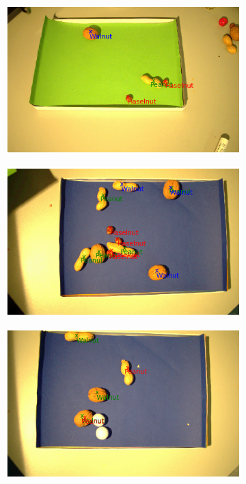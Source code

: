 \documentclass[journal,onecolumn,12pt]{IEEEtran}
\begin{document}
\begin{figure}
	\centering
	\begin{subfigure}[b]{0.4\textwidth}
		\centering
		\includegraphics[width=\textwidth]{images/od/perfect_70.png}
	\end{subfigure}
	\begin{subfigure}[b]{0.4\textwidth}  
		\centering 
		\includegraphics[width=\textwidth]{images/od/CV19_video_337.png}
	\end{subfigure}
	\begin{subfigure}[b]{0.4\textwidth}  
		\centering 
		\includegraphics[width=\textwidth]{images/od/missclass_41.png}

\end{subfigure}
\end{figure}
\end{document}
